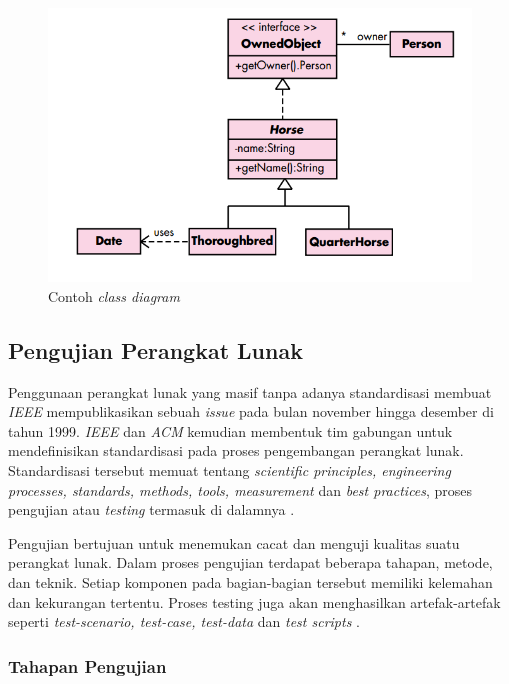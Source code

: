 \begin{figure}[tph]
  \centering
  \includegraphics[width=.6\linewidth]{img/contoh-class}
  \caption{Contoh \emph{class diagram} \parencite{pressman2010software}}
  \label{fig:contoh-class-diagram}
\end{figure}


\subsection{Pengujian Perangkat Lunak}


Penggunaan perangkat lunak yang masif tanpa adanya standardisasi
membuat \emph{IEEE} mempublikasikan sebuah \emph{issue} pada bulan november
hingga desember di tahun 1999. \emph{IEEE} dan \emph{ACM} kemudian
membentuk tim gabungan untuk mendefinisikan standardisasi pada proses
pengembangan perangkat lunak. Standardisasi tersebut memuat tentang
\emph{scientific principles, engineering processes, standards,
  methods, tools, measurement} dan \emph{best practices}, proses pengujian
atau \emph{testing} termasuk di dalamnya \parencite{burnstein2006practical}.

Pengujian bertujuan untuk menemukan cacat dan menguji kualitas suatu
perangkat lunak. Dalam proses pengujian terdapat beberapa tahapan, metode, dan
teknik. Setiap komponen pada bagian-bagian tersebut memiliki
kelemahan dan kekurangan tertentu. Proses testing juga akan
menghasilkan artefak-artefak seperti \emph{test-scenario, test-case,
  test-data} dan \emph{test scripts} \parencite{burnstein2006practical}.

\subsubsection{Tahapan Pengujian}

